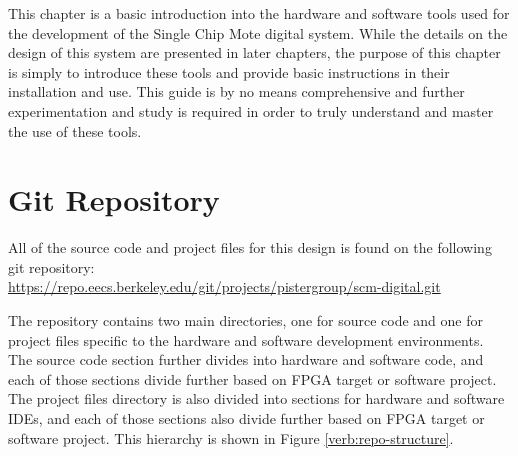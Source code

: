 This chapter is a basic introduction into the hardware and software tools used for the development of the Single Chip Mote digital system. While the details on the design of this system are presented in later chapters, the purpose of this chapter is simply to introduce these tools and provide basic instructions in their installation and use. This guide is by no means comprehensive and further experimentation and study is required in order to truly understand and master the use of these tools.

\section{Git Repository}
All of the source code and project files for this design is found on the following git repository:
\\ \url{https://repo.eecs.berkeley.edu/git/projects/pistergroup/scm-digital.git}

The repository contains two main directories, one for source code and one for project files specific to the hardware and software development environments. The source code section further divides into hardware and software code, and each of those sections divide further based on FPGA target or software project. The project files directory is also divided into sections for hardware and software IDEs, and each of those sections also divide further based on FPGA target or software project. This hierarchy is shown in Figure \ref{verb:repo-structure}.

